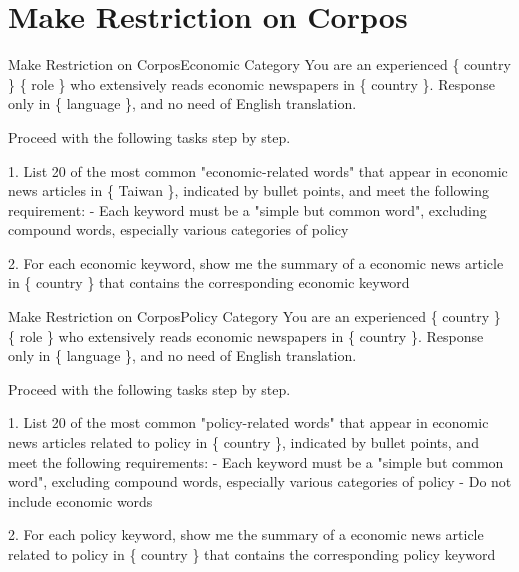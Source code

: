 \documentclass[11.5pt]{beamer}
\begin{document}
\section{Make Restriction on Corpos}
\begin{frame}{Make Restriction on Corpos}{Economic Category}
You are an experienced \{ country \} \{ role \} who extensively reads economic
newspapers in \{ country \}. Response only in \{ language \}, and no
need of English translation. \newline

Proceed with the following tasks step by step. \newline

1. List 20 of the most common "economic-related words" that appear in
    economic news articles in \{ Taiwan \}, indicated by bullet points, and meet
    the following requirement: \newline
- Each keyword must be a "simple but common word", excluding compound words,
    especially various categories of policy \newline

2. For each economic keyword, show me the summary of a economic news
    article in \{ country \} that contains the corresponding economic keyword
\end{frame}


\begin{frame}{Make Restriction on Corpos}{Policy Category}
You are an experienced \{ country \} \{ role \} who extensively reads economic
newspapers in \{ country \}. Response only in \{ language \}, and no
need of English translation. \newline

Proceed with the following tasks step by step. \newline

1. List 20 of the most common "policy-related words" that appear in
    economic news articles related to policy in \{ country \}, indicated by
    bullet points, and meet the following requirements: \newline
- Each keyword must be a "simple but common word", excluding compound words,
    especially various categories of policy \newline
- Do not include economic words

2. For each policy keyword, show me the summary of a economic news
    article related to policy in \{ country \} that contains the
    corresponding policy keyword
\end{frame}
\end{document}
